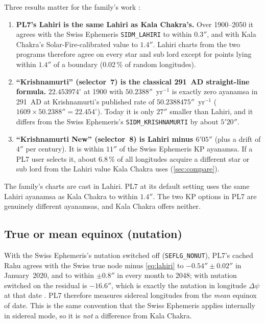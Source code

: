 Three results matter for the family's work \tagNUM:

\begin{enumerate}[leftmargin=*]
  \item \textbf{PL7's Lahiri is the same Lahiri as Kala Chakra's.} Over 1900--2050 it
  agrees with the Swiss Ephemeris \texttt{SIDM\_LAHIRI} to within $0.3''$, and with Kala
  Chakra's Solar-Fire-calibrated value to $1.4''$. Lahiri charts from the two programs
  therefore agree on every star and sub lord except for points lying within $1.4''$ of a
  boundary (0.02\,\% of random longitudes).
  \item \textbf{``Krishnamurti'' (selector~7) is the classical 291~AD straight-line
  formula.} $22.453974^\circ$ at 1900 with $50.2388''$~yr$^{-1}$ is exactly zero
  ayanamsa in 291~AD at Krishnamurti's published rate of $50.2388475''$~yr$^{-1}$
  ($1609 \times 50.2388'' = 22.454^\circ$). Today it is only $27''$ smaller than Lahiri,
  and it differs from the Swiss Ephemeris's \texttt{SIDM\_KRISHNAMURTI} by about $5'20''$.
  \item \textbf{``Krishnamurti New'' (selector~8) is Lahiri minus $6'05''$} (plus a drift
  of $4''$ per century). It is within $11''$ of the Swiss Ephemeris KP ayanamsa. If a PL7
  user selects it, about 6.8\,\% of all longitudes acquire a different star or sub lord
  from the Lahiri value Kala Chakra uses (\autoref{sec:compare}).
\end{enumerate}

\begin{keybox}\kidea The family's charts are cast in Lahiri. PL7 at its default setting uses
the same Lahiri ayanamsa as Kala Chakra to within $1.4''$. The two KP options in PL7 are
genuinely different ayanamsas, and Kala Chakra offers neither.\end{keybox}

\subsection{True or mean equinox (nutation)}

With the Swiss Ephemeris's nutation switched off (\texttt{SEFLG\_NONUT}), PL7's cached
Rahu agrees with the Swiss true node minus \autoref{eq:lahiri} to $-0.54'' \pm 0.02''$ in
January~2020, and to within $\pm 0.8''$ in every month to 2048; with nutation switched on
the residual is $-16.6''$, which is exactly the nutation in longitude $\Delta\psi$ at
that date \tagNUM. PL7 therefore measures sidereal longitudes from the \emph{mean}
equinox of date. This is the same convention that the Swiss Ephemeris applies internally
in sidereal mode, so it is \emph{not} a difference from Kala Chakra.

